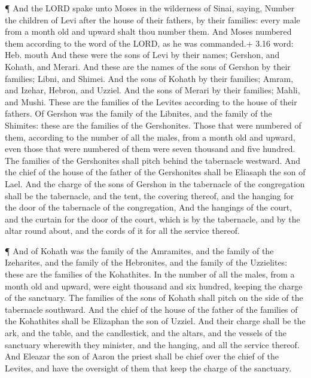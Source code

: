  ¶ And the LORD spake unto Moses in the wilderness of
Sinai, saying,  Number the children of Levi after the house
of their fathers, by their families: every male from a month old and
upward shalt thou number them.  And Moses numbered them
according to the word of the LORD, as he was commanded.+ 3.16 word: Heb.
mouth  And these were the sons of Levi by their names;
Gershon, and Kohath, and Merari.  And these are the names
of the sons of Gershon by their families; Libni, and Shimei.
 And the sons of Kohath by their families; Amram, and
Izehar, Hebron, and Uzziel.  And the sons of Merari by
their families; Mahli, and Mushi. These are the families of the Levites
according to the house of their fathers.  Of Gershon was
the family of the Libnites, and the family of the Shimites: these are
the families of the Gershonites.  Those that were numbered
of them, according to the number of all the males, from a month old and
upward, even those that were numbered of them were seven thousand and
five hundred.  The families of the Gershonites shall pitch
behind the tabernacle westward.  And the chief of the house
of the father of the Gershonites shall be Eliasaph the son of Lael.
 And the charge of the sons of Gershon in the tabernacle of
the congregation shall be the tabernacle, and the tent, the covering
thereof, and the hanging for the door of the tabernacle of the
congregation,  And the hangings of the court, and the
curtain for the door of the court, which is by the tabernacle, and by
the altar round about, and the cords of it for all the service thereof.

 ¶ And of Kohath was the family of the Amramites, and the
family of the Izeharites, and the family of the Hebronites, and the
family of the Uzzielites: these are the families of the Kohathites.
 In the number of all the males, from a month old and
upward, were eight thousand and six hundred, keeping the charge of the
sanctuary.  The families of the sons of Kohath shall pitch
on the side of the tabernacle southward.  And the chief of
the house of the father of the families of the Kohathites shall be
Elizaphan the son of Uzziel.  And their charge shall be the
ark, and the table, and the candlestick, and the altars, and the vessels
of the sanctuary wherewith they minister, and the hanging, and all the
service thereof.  And Eleazar the son of Aaron the priest
shall be chief over the chief of the Levites, and have the oversight of
them that keep the charge of the sanctuary.

